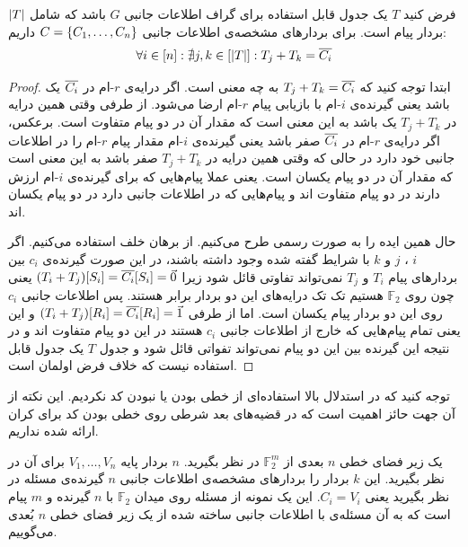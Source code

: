 \begin{lemma}
	\label{lemma:tableconstraint}
	فرض کنید
	$T$
	یک جدول قابل استفاده برای گراف اطلاعات جانبی
	$G$
	باشد که شامل
	$\left|{T}\right|$
	بردار پیام است. برای بردارهای مشخصه‌ی اطلاعات جانبی
	$C = \left\{ C_1, \ldots, C_n \right\}$
	داریم:
	\begin{align}
		\forall i \in [n]: \nexists j, k \in [\left|{T}\right|]: T_j + T_k = \overline{C_i}
	\end{align}
\end{lemma}
\begin{proof}
	ابتدا توجه کنید که
	$T_j + T_k = \overline{C_i}$
	به چه معنی است. اگر درایه‌ی
	$r$-ام
	در
	$\overline{C_i}$
	یک باشد یعنی گیرنده‌ی
	$i$-ام
	با بازیابی پیام
	$r$-ام
	ارضا می‌شود. از طرفی وقتی همین درایه در
	$T_j + T_k$
	یک باشد به این معنی است که مقدار آن در دو پیام متفاوت است. برعکس، اگر درایه‌ی 
	$r$-ام
	در
	$\overline{C_i}$
	صفر باشد یعنی گیرنده‌ی $i$-ام
	مقدار پیام
	$r$-ام
	را در اطلاعات جانبی خود دارد در حالی که وقتی همین درایه در
	$T_j + T_k$
	صفر باشد به این معنی است که مقدار آن در دو پیام یکسان است. یعنی عملا پیام‌هایی که برای گیرنده‌ی
	$i$-ام
	ارزش دارند در دو پیام متفاوت اند و پیام‌هایی که در اطلاعات جانبی دارد در دو پیام یکسان اند.
	
	حال همین ایده را به صورت رسمی طرح می‌کنیم. از برهان خلف استفاده می‌کنیم. اگر
	$i$
	،
	$j$
	و
	$k$
	با شرایط گفته شده وجود داشته باشند، در این صورت گیرنده‌ی
	$c_i$
	بین بردارهای پیام
	$T_i$
	و
	$T_j$
	نمی‌تواند تفاوتی قائل شود زیرا
	$(T_i + T_j)[S_i] = \overline{C_i}[S_i] = \vec{0}$
	یعنی چون روی
	$\mathbb{F}_2$
	هستیم تک تک درایه‌های این دو بردار برابر هستند. پس اطلاعات جانبی
	$c_i$
	روی این دو بردار پیام یکسان است. اما از طرفی
	$(T_i + T_j)[R_i] = \overline{C_i}[R_i] = \vec{1}$
	و این یعنی تمام پیام‌هایی که خارج از اطلاعات جانبی
	$c_i$
	هستند در این دو پیام متفاوت اند و در نتیجه این گیرنده بین این دو پیام نمی‌تواند تفواتی قائل شود و جدول
	$T$
	یک جدول قابل استفاده نیست که خلاف فرض اولمان است.
\end{proof}
\begin{remark}
توجه کنید که در استدلال بالا استفاده‌ای از خطی بودن یا نبودن کد نکردیم. این نکته از آن جهت حائز اهمیت است که در قضیه‌های بعد شرطی روی خطی بودن کد برای کران ارائه شده نداریم.
\end{remark}
\begin{definition}
	\label{def:our:linearspacepicod}
	 یک زیر فضای خطی 
	$n$
	بعدی از
	$\mathbb{F}^m_2$
	در نظر بگیرید.
	$n$
	بردار پایه
	$V_1, \ldots, V_n$
	برای آن در نظر بگیرید. این 
	$k$
	بردار را بردارهای مشخصه‌ی اطلاعات جانبی 
	$n$
	گیرنده‌ی مسئله در نظر بگیرید یعنی
	$C_i = V_i$.
	این یک نمونه از مسئله
	\picod
	روی میدان
	$\mathbb{F}_2$
	با
	$n$
	گیرنده و 
	$m$
	پیام است که به آن مسئله‌ی 
	\picod
	با اطلاعات جانبی ساخته شده از یک زیر فضای خطی
	$n$
	بُعدی می‌گوییم.
\end{definition}

